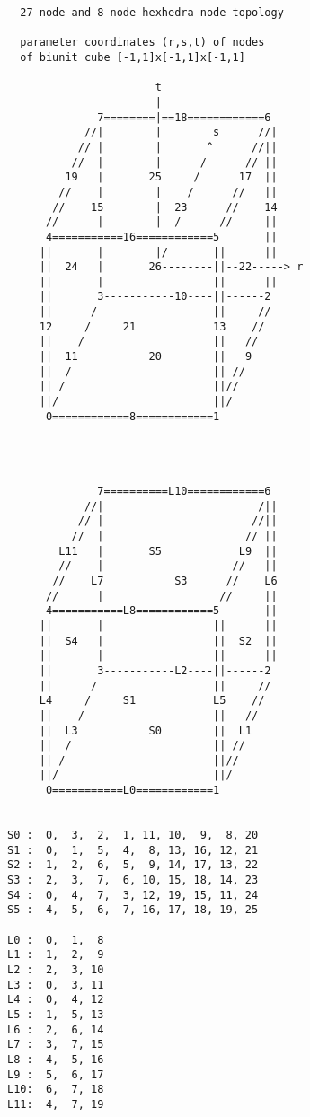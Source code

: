 \begin{verbatim}
  27-node and 8-node hexhedra node topology

  parameter coordinates (r,s,t) of nodes
  of biunit cube [-1,1]x[-1,1]x[-1,1]

                       t
                       |
              7========|==18============6
            //|        |        s      //|
           // |        |       ^      //||
          //  |        |      /      // ||
         19   |       25     /      17  ||
        //    |        |    /      //   ||
       //    15        |  23      //    14
      //      |        |  /      //     ||
      4===========16============5       ||
     ||       |        |/       ||      ||
     ||  24   |       26--------||--22-----> r
     ||       |                 ||      ||
     ||       3-----------10----||------2
     ||      /                  ||     //
     12     /     21            13    //
     ||    /                    ||   //
     ||  11           20        ||   9
     ||  /                      || //
     || /                       ||//
     ||/                        ||/
      0============8============1




              7==========L10============6
            //|                        /||
           // |                       //||
          //  |                      // ||
        L11   |       S5            L9  ||
        //    |                    //   ||
       //    L7           S3      //    L6
      //      |                  //     ||
      4===========L8============5       ||
     ||       |                 ||      ||
     ||  S4   |                 ||  S2  ||
     ||       |                 ||      ||
     ||       3-----------L2----||------2
     ||      /                  ||     //
     L4     /     S1            L5    //
     ||    /                    ||   //
     ||  L3           S0        ||  L1
     ||  /                      || //
     || /                       ||//
     ||/                        ||/
      0===========L0============1


S0 :  0,  3,  2,  1, 11, 10,  9,  8, 20
S1 :  0,  1,  5,  4,  8, 13, 16, 12, 21
S2 :  1,  2,  6,  5,  9, 14, 17, 13, 22
S3 :  2,  3,  7,  6, 10, 15, 18, 14, 23
S4 :  0,  4,  7,  3, 12, 19, 15, 11, 24
S5 :  4,  5,  6,  7, 16, 17, 18, 19, 25

L0 :  0,  1,  8
L1 :  1,  2,  9
L2 :  2,  3, 10
L3 :  0,  3, 11
L4 :  0,  4, 12
L5 :  1,  5, 13
L6 :  2,  6, 14
L7 :  3,  7, 15
L8 :  4,  5, 16
L9 :  5,  6, 17
L10:  6,  7, 18
L11:  4,  7, 19

\end{verbatim}


